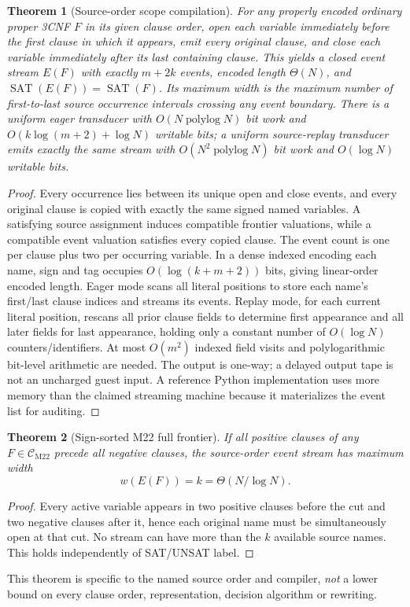 \documentclass[11pt]{article}
\newtheorem{theorem}{Theorem}
\newcommand{\CM}{\mathcal C_{\mathrm{M22}}}
\newcommand{\SAT}{\operatorname{SAT}}
\begin{document}
\begin{theorem}[Source-order scope compilation]
For any properly encoded ordinary proper 3CNF $F$ in its given clause order, open each variable immediately before the first clause in which it appears, emit every original clause, and close each variable immediately after its last containing clause. This yields a closed event stream $E(F)$ with exactly $m+2k$ events, encoded length $\Theta(N)$, and $\SAT(E(F))=\SAT(F)$. Its maximum width is the maximum number of first-to-last source occurrence intervals crossing any event boundary. There is a uniform eager transducer with $O(N\operatorname{polylog}N)$ bit work and $O(k\log(m+2)+\log N)$ writable bits; a uniform source-replay transducer emits exactly the same stream with $O(N^2\operatorname{polylog}N)$ bit work and $O(\log N)$ writable bits.
\end{theorem}
\begin{proof}
Every occurrence lies between its unique open and close events, and every original clause is copied with exactly the same signed named variables. A satisfying source assignment induces compatible frontier valuations, while a compatible event valuation satisfies every copied clause. The event count is one per clause plus two per occurring variable. In a dense indexed encoding each name, sign and tag occupies $O(\log(k+m+2))$ bits, giving linear-order encoded length. Eager mode scans all literal positions to store each name's first/last clause indices and streams its events. Replay mode, for each current literal position, rescans all prior clause fields to determine first appearance and all later fields for last appearance, holding only a constant number of $O(\log N)$ counters/identifiers. At most $O(m^2)$ indexed field visits and polylogarithmic bit-level arithmetic are needed. The output is one-way; a delayed output tape is not an uncharged guest input. A reference Python implementation uses more memory than the claimed streaming machine because it materializes the event list for auditing.
\end{proof}

\begin{theorem}[Sign-sorted M22 full frontier]
If all positive clauses of any $F\in\CM$ precede all negative clauses, the source-order event stream has maximum width
\[
\boxed{w(E(F))=k=\Theta(N/\log N).}
\]
\end{theorem}
\begin{proof}
Every active variable appears in two positive clauses before the cut and two negative clauses after it, hence each original name must be simultaneously open at that cut. No stream can have more than the $k$ available source names. This holds independently of SAT/UNSAT label.
\end{proof}
\noindent This theorem is specific to the named source order and compiler, \emph{not} a lower bound on every clause order, representation, decision algorithm or rewriting.
\end{document}
